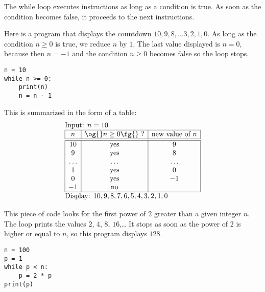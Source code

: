 \documentclass[11pt,class=report,crop=false]{standalone}
\begin{document}
\begin{cours}
The \og{}while\fg{} loop executes instructions as long as a condition is true.
As soon as the condition becomes false, it proceeds to the next instructions.




\begin{exemple}
\begin{minipage}{0.55\textwidth}
Here is a program that displays the countdown $10,9,8,\ldots3,2,1,0$.
As long as the condition $n \ge 0$ is true, we reduce $n$ by $1$. The last value displayed is $n=0$, because then $n=-1$ and the condition \og{}$n \ge 0$\fg{} becomes false so the loop stops.
\end{minipage}\qquad\qquad
\begin{minipage}{0.4\textwidth}
\begin{lstlisting}
n = 10
while n >= 0:
    print(n)
    n = n - 1
\end{lstlisting}
\end{minipage}

\medskip

This is summarized in the form of a table:
  $$
  \begin{array}{l}
  \text{Input: $n=10$}    \\
  \begin{array}{|c|c|c|}
  \hline  
  n & \text{\og{}$n\ge0$\fg{} ?} & \text{new value of } n \\
  \hline\hline 
  10 & \text{yes} & 9 \\
  9 & \text{yes} & 8 \\
  \ldots & \ldots & \ldots \\
  1 & \text{yes} & 0 \\
  0 & \text{yes} & -1 \\
  -1 & \text{no} &  \\ 
  \hline
  \end{array} \\
  \text{Display: $10,9,8,7,6,5,4,3,2,1,0$}  
  \end{array} 
  $$ 

\end{exemple}


\begin{exemple}
\begin{minipage}{0.55\textwidth}
This piece of code looks for the first power of $2$ greater than a given integer $n$.
The loop prints the values $2$, $4$, $8$, $16$,\ldots{} It stops as soon as the power of $2$ is higher or equal to $n$, so this program displays $128$.
\end{minipage}\qquad\qquad
\begin{minipage}{0.4\textwidth}
\begin{lstlisting}
n = 100
p = 1
while p < n:
    p = 2 * p
print(p)
\end{lstlisting}
\end{minipage}


\end{exemple}
\end{cours}
\end{document}
